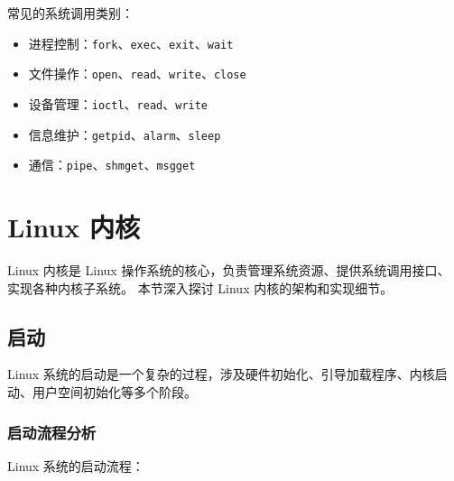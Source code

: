 常见的系统调用类别：
\begin{itemize}
  \item 进程控制：\texttt{fork}、\texttt{exec}、\texttt{exit}、\texttt{wait}
  \item 文件操作：\texttt{open}、\texttt{read}、\texttt{write}、\texttt{close}
  \item 设备管理：\texttt{ioctl}、\texttt{read}、\texttt{write}
  \item 信息维护：\texttt{getpid}、\texttt{alarm}、\texttt{sleep}
  \item 通信：\texttt{pipe}、\texttt{shmget}、\texttt{msgget}
\end{itemize}

\section{Linux 内核}

Linux 内核是 Linux 操作系统的核心，负责管理系统资源、提供系统调用接口、实现各种内核子系统。
本节深入探讨 Linux 内核的架构和实现细节。

\subsection{启动}

Linux 系统的启动是一个复杂的过程，涉及硬件初始化、引导加载程序、内核启动、用户空间初始化等多个阶段。

\subsubsection{启动流程分析}


Linux 系统的启动流程：


